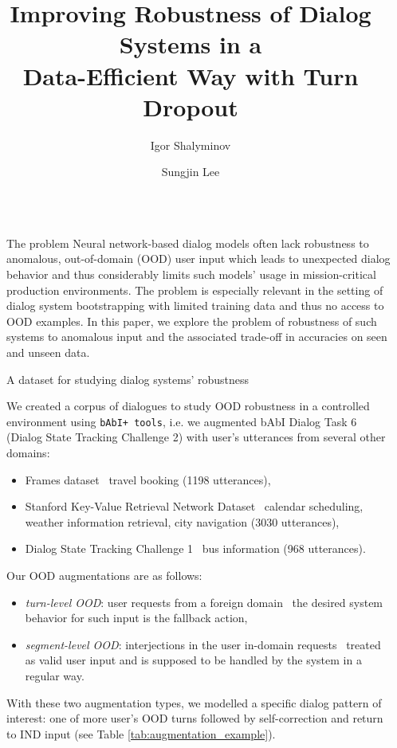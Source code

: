 \documentclass[final]{beamer}
\title{Improving Robustness of Dialog Systems in a \\ Data-Efficient Way with Turn Dropout}
\author{Igor Shalyminov \and Sungjin Lee}
\institute{\begin{tabular}[h]{ccccccc}
      & & &Heriot-Watt University & & & Microsoft Research \\
      & & &Edinburgh, UK & & &  Redmond, USA \\
      & & &\texttt{is33@hw.ac.uk} & & & \texttt{sule@microsoft.com}
  \end{tabular}
}
\newlength{\sepwidth}
\newlength{\colwidth}
\newcommand{\separatorcolumn}{\begin{column}{\sepwidth}\end{column}}
\begin{document}
\begin{frame}[t]
\begin{columns}[t]

\separatorcolumn

\begin{column}{\colwidth}
\begin{alertblock}{The problem}
Neural network-based dialog models often lack robustness to anomalous, out-of-domain (OOD) user input which leads to unexpected dialog behavior and thus considerably limits such models' usage in mission-critical production environments. The problem is especially relevant in the setting of dialog system bootstrapping with limited training data and thus no access to OOD examples. In this paper, we explore the problem of robustness of such systems to anomalous input and the associated  trade-off in accuracies on seen and unseen data.
\end{alertblock}

\begin{block}{A dataset for studying dialog systems' robustness}

We created a corpus of dialogues to study OOD robustness in a controlled environment using \texttt{bAbI+ tools}, i.e. we augmented bAbI Dialog Task 6 (Dialog State Tracking Challenge 2) with user's utterances from several other domains:
\begin{itemize}
    \item Frames dataset~\textemdash{} travel booking (1198 utterances),
    \item Stanford Key-Value Retrieval Network Dataset~\textemdash{} calendar scheduling, weather information retrieval, city navigation (3030 utterances),
    \item Dialog State Tracking Challenge 1~\textemdash{} bus information (968 utterances).
\end{itemize}

Our OOD augmentations are as follows:
\begin{itemize}
  \item \textit{turn-level OOD}: user requests from a foreign domain~\textemdash{} the desired system behavior for such input is the fallback action,
  \item \textit{segment-level OOD}: interjections in the user in-domain requests~\textemdash{} treated as valid user input and is supposed to be handled by the system in a regular way.
\end{itemize}

With these two augmentation types, we modelled a specific dialog pattern of interest: one of more user's OOD turns followed by self-correction and return to IND input (see Table \ref{tab:augmentation_example}).


\end{block}
\end{column}
\end{columns}
\end{frame}
\end{document}
